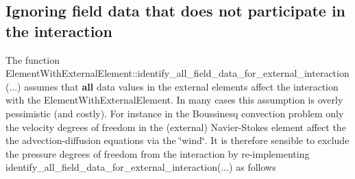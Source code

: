 \hypertarget{index_restricting_field_data}{}\subsection{Ignoring field data that does not participate in the interaction}\label{index_restricting_field_data}
The function {\ttfamily Element\+With\+External\+Element\+::identify\+\_\+all\+\_\+field\+\_\+data\+\_\+for\+\_\+external\+\_\+interaction}(...) assumes that {\bfseries all} data values in the external elements affect the interaction with the {\ttfamily Element\+With\+External\+Element}. In many cases this assumption is overly pessimistic (and costly). For instance in the Boussinesq convection problem only the velocity degrees of freedom in the (external) Navier-\/\+Stokes element affect the the advection-\/diffusion equations via the \char`\"{}wind\char`\"{}. It is therefore sensible to exclude the pressure degrees of freedom from the interaction by re-\/implementing {\ttfamily identify\+\_\+all\+\_\+field\+\_\+data\+\_\+for\+\_\+external\+\_\+interaction}(...) as follows


